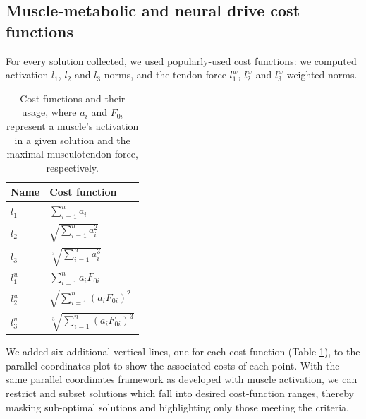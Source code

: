 \subsection*{Muscle-metabolic and neural drive cost functions}

For every solution collected, we used popularly-used cost functions: we computed activation $l_1$, $l_2$ and $l_3$ norms, and the tendon-force $l_1^w$, $l_2^w$ and $l_3^w$ weighted norms.


\begin{table}[h]
\centering
\begin{tabular}{@{}ll@{}}
\toprule
\textbf{Name} & \textbf{Cost function}  \\ \midrule
$l_1$            & $\sum_{i=1}^n a_i$                                     \\
$l_2$            & $\sqrt{\sum_{i=1}^n a_i^2}$                                    \\
$l_3$            & $\sqrt[3]{\sum_{i=1}^n a_i^3}$                                   \\
$l_1^w$            & $\sum_{i=1}^n a_i F_{0i}$                                    \\
$l_2^w$            & $\sqrt{\sum_{i=1}^n (a_i F_{0i})^2}$                                  \\
$l_3^w$            & $\sqrt[3]{\sum_{i=1}^n (a_i F_{0i})^3}$                                    \\ \bottomrule
\end{tabular}
\caption{Cost functions and their usage, where $a_i$ and $F_{0i}$ represent a muscle's activation in a given solution and the maximal musculotendon force, respectively.}
\label{cost_function_tabls}
\end{table}

We added six additional vertical lines, one for each cost function (Table \ref{cost_function_tabls}), to the parallel coordinates plot to show the associated costs of each point. With the same parallel coordinates framework as developed with muscle activation, we can restrict and subset solutions which fall into desired cost-function ranges, thereby masking sub-optimal solutions and highlighting only those meeting the criteria.

